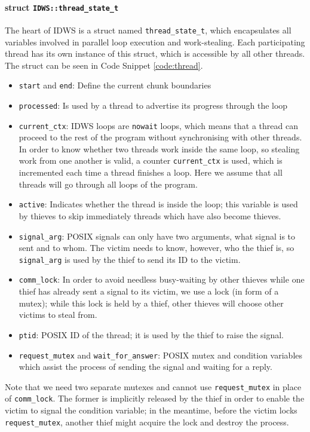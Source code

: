 \documentclass{acm_proc_article-sp}
\begin{document}
\paragraph{struct \texttt{IDWS::thread\_state\_t}}
The heart of IDWS is a struct named \texttt{thread\_state\_t}, which 
encapsulates all variables involved in parallel loop execution and 
work-stealing. Each participating thread has its own instance of this struct, 
which is accessible by all other threads. The struct can be seen in Code 
Snippet \ref{code:thread}.
\begin{itemize}
\item \texttt{start} and \texttt{end}: Define the current chunk boundaries
\item \texttt{processed}: Is used by a thread to advertise its progress through 
the loop
\item \texttt{current\_ctx}: IDWS loops are \texttt{nowait} loops, which means 
that a thread can proceed to the rest of the program without synchronising with 
other threads. In order to know whether two threads work inside the same loop, 
so stealing work from one another is valid, a counter \texttt{current\_ctx} is 
used, which is incremented each time a thread finishes a loop. Here we assume 
that all threads will go through all loops of the program.
\item \texttt{active}: Indicates whether the thread is inside the loop; this 
variable is used by thieves to skip immediately threads which have also become 
thieves.
\item \texttt{signal\_arg}: POSIX signals can only have two arguments, what 
signal is to sent and to whom. The victim needs to know, however, who the thief 
is, so \texttt{signal\_arg} is used by the thief to send its ID to the victim.
\item \texttt{comm\_lock}: In order to avoid needless busy-waiting by other 
thieves while one thief has already sent a signal to its victim, we use a lock 
(in form of a mutex); while this lock is held by a thief, other thieves will 
choose other victims to steal from.
\item \texttt{ptid}: POSIX ID of the thread; it is used by the thief to 
raise the signal.
\item \texttt{request\_mutex} and \texttt{wait\_for\_answer}: POSIX mutex and 
condition variables which assist the process of sending the signal and waiting 
for a reply.
\end{itemize}

Note that we need two separate mutexes and cannot use \texttt{request\_mutex} 
in place of \texttt{comm\_lock}. The former is implicitly released by the thief 
in order to enable the victim to signal the condition variable; in the 
meantime, before the victim locks \texttt{request\_mutex}, another thief might 
acquire the lock and 
destroy the process.
\end{document}
